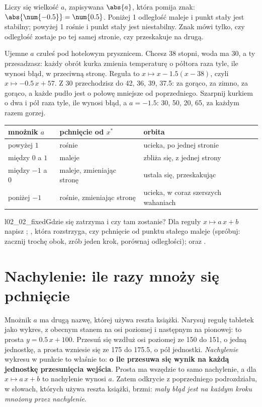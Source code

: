 Liczy się wielkość $a$, zapisywana $\abs{a}$, która pomija znak:
$\abs{\num{-0.5}} = \num{0.5}$. Poniżej 1 odległość maleje i punkt stały
jest stabilny; powyżej 1 rośnie i punkt stały jest niestabilny. Znak mówi
tylko, czy odległość zostaje po tej samej stronie, czy przeskakuje na
drugą.

Ujemne $a$ czułeś pod hotelowym prysznicem. Chcesz 38 stopni, woda ma 30, a
ty przesadzasz: każdy obrót kurka zmienia temperaturę o półtora raza tyle,
ile wynosi błąd, w przeciwną stronę. Reguła to $x \mapsto x - \num{1.5}(x -
38)$, czyli $x \mapsto \num{-0.5}\,x + 57$. Z 30 przechodzisz do 42, 36, 39,
\num{37.5}: za gorąco, za zimno, za gorąco, a każde pudło jest o połowę
mniejsze od poprzedniego. Szarpnij kurkiem o dwa i pół raza tyle, ile
wynosi błąd, a $a = \num{-1.5}$: 30, 50, 20, 65, za każdym razem gorzej.

\begin{center}
\begin{tabularx}{\linewidth}{@{}lXX@{}}
\toprule
mnożnik $a$ & pchnięcie od $x^{*}$ & orbita \\
\midrule
powyżej $1$ & rośnie & ucieka, po jednej stronie \\
między $0$ a $1$ & maleje & zbliża się, z jednej strony \\
między $-1$ a $0$ & maleje, zmieniając stronę & ustala się, przeskakując \\
poniżej $-1$ & rośnie, zmieniając stronę & ucieka, w coraz szerszych
wahaniach \\
\bottomrule
\end{tabularx}
\end{center}

\begin{lab}{l02_02_fixed}{Gdzie się zatrzyma i czy tam zostanie?}
Dla reguły $x \mapsto a\,x + b$ napisz ;
, która rozstrzyga, czy pchnięcie od punktu stałego maleje
(spróbuj: zacznij trochę obok, zrób jeden krok, porównaj odległości); oraz
.
\end{lab}

\section{Nachylenie: ile razy mnoży się pchnięcie}
\label{sec:ch02-slope}

\noindent
Mnożnik $a$ ma drugą nazwę, której używa reszta książki. Narysuj regułę
tabletek jako wykres, z obecnym stanem na osi poziomej i następnym na
pionowej: to prosta $y = \num{0.5}\,x + 100$. Przesuń się wzdłuż osi
poziomej ze 150 do 151, o jedną jednostkę, a prosta wzniesie się ze 175 do
\num{175.5}, o pół jednostki. \emph{Nachylenie} wykresu w punkcie to
właśnie to: \textbf{o ile przesuwa się wynik na każdą jednostkę
przesunięcia wejścia}. Prosta ma wszędzie to samo nachylenie, a dla
$x \mapsto a\,x + b$ to nachylenie wynosi $a$. Zatem odkrycie z
poprzedniego podrozdziału, w słowach, których używa reszta książki,
brzmi: \emph{mały błąd jest na każdym kroku mnożony przez nachylenie}.

